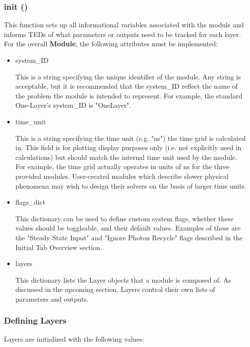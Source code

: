 \documentclass[11pt,letterpaper,titlepage]{article}
\begin{document}
		\subsubsection{\textunderscore\textunderscore init \textunderscore\textunderscore()}
		
		\par This function sets up all informational variables associated with the module and informs TEDs of what parameters or outputs need to be tracked for each layer. For the overall  \textbf{Module}, the following attributes must be implemented:
		
		\begin{itemize}
			\item system\_ID
			\par This is a string specifying the unique identifier of the module. Any string is acceptable, but it is recommended that the system\_ID reflect the name of the problem the module is intended to represent. For example, the standard One-Layer's system\_ID is "OneLayer".
			
			\item time\_unit
			\par This is a string specifying the time unit (e.g. "ns") the time grid is calculated in. This field is for plotting display purposes only (i.e. not explicitly used in calculations) but should match the internal time unit used by the module. For example, the time grid actually operates in units of ns for the three provided modules. User-created modules which describe slower physical phenomena may wish to design their solvers on the basis of larger time units.
			
			\item flags\_dict
			\par This dictionary can be used to define custom system flags, whether these values should be toggleable, and their default values. Examples of these are the "Steady State Input" and "Ignore Photon Recycle" flags described in the Initial Tab Overview section.
			
			\item layers
			\par This dictionary lists the Layer objects that a module is composed of. As discussed in the upcoming section, Layers control their own lists of parameters and outputs.
			
		\end{itemize}
	
		\subsubsection{Defining Layers}
		\par Layers are initialized with the following values:
		
\end{document}
